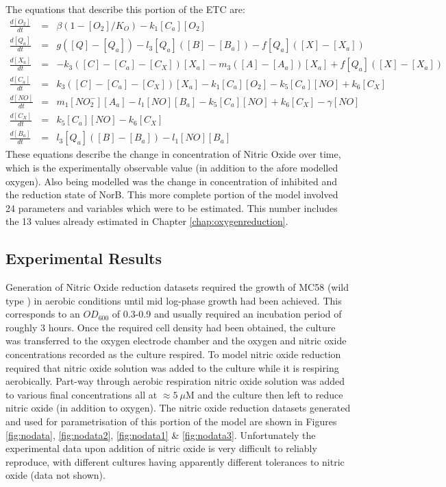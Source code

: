 The equations that describe this portion of the ETC are:
\begin{eqnarray*}
\frac{d[O_2]}{dt} & = & \beta(1-[O_2]/K_O) - k_{1}[C_a][O_2]\\
\frac{d[Q_a]}{dt} & = & g([Q] - [Q_a]) - l_3[Q_a]([B] - [B_a]) - f[Q_a]([X]-[X_a])\\
\frac{d[X_a]}{dt} & = & -k_3([C] - [C_a] - [C_X])[X_a]  - m_3([A] - [A_a])[X_a] + f[Q_a]([X]-[X_a])\\
\frac{d[C_a]}{dt} & = & k_3([C] - [C_a] - [C_X])[X_a] - k_{1}[C_a][O_2] - k_5[C_a][NO] + k_6[C_X]\\
\frac{d[NO]}{dt} & = & m_{1}[NO_2^-][A_a] - l_1[NO][B_a] - k_5[C_a][NO] + k_6 [C_X] - \gamma[NO]\\
\frac{d[C_X]}{dt} & = & k_5[C_a][NO] - k_6 [C_X]\\
\frac{d[B_a]}{dt} & = & l_3[Q_a]([B] - [B_a]) - l_1[NO][B_a]
\end{eqnarray*}
These equations describe the change in concentration of Nitric Oxide over time, which is the experimentally observable value (in addition to the afore modelled oxygen). Also being modelled was the change in concentration of inhibited \cbbthree{} and the reduction state of NorB. This more complete portion of the model involved 24 parameters and variables which were to be estimated. This number includes the 13 values already estimated in Chapter \ref{chap:oxygenreduction}.
\subsection{Experimental Results}
Generation of Nitric Oxide reduction datasets required the growth of MC58 (wild type \Nsm{}) in aerobic conditions until mid log-phase growth had been achieved. This corresponds to an $OD_{600}$ of 0.3-0.9 and usually required an incubation period of roughly 3 hours. Once the required cell density had been obtained, the culture was transferred to the oxygen electrode chamber and the oxygen and nitric oxide concentrations recorded as the culture respired. To model nitric oxide reduction required that nitric oxide solution was added to the culture while it is respiring aerobically. Part-way through aerobic respiration nitric oxide solution was added to various final concentrations all at $\approx 5~\mu$M and the culture then left to reduce nitric oxide (in addition to oxygen). The nitric oxide reduction datasets generated and used for parametrisation of this portion of the model are shown in Figures \ref{fig:nodata}, \ref{fig:nodata2}, \ref{fig:nodata1} \& \ref{fig:nodata3}. Unfortunately the experimental data upon addition of nitric oxide is very difficult to reliably reproduce, with different cultures having apparently different tolerances to nitric oxide (data not shown).

